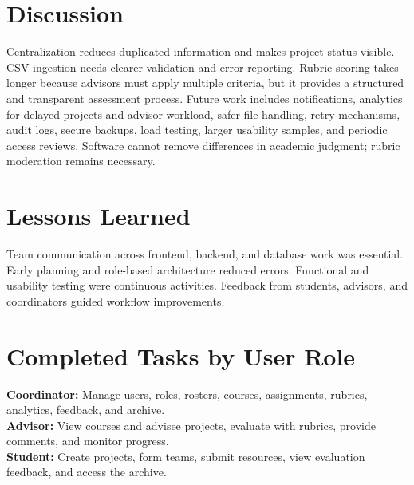 \documentclass[12pt,a4paper]{report}
\begin{document}
\section{Discussion}
Centralization reduces duplicated information and makes project status visible. CSV ingestion needs clearer validation and error reporting. Rubric scoring takes longer because advisors must apply multiple criteria, but it provides a structured and transparent assessment process. Future work includes notifications, analytics for delayed projects and advisor workload, safer file handling, retry mechanisms, audit logs, secure backups, load testing, larger usability samples, and periodic access reviews. Software cannot remove differences in academic judgment; rubric moderation remains necessary.
\section{Lessons Learned}
Team communication across frontend, backend, and database work was essential. Early planning and role-based architecture reduced errors. Functional and usability testing were continuous activities. Feedback from students, advisors, and coordinators guided workflow improvements.
\section{Completed Tasks by User Role}
\textbf{Coordinator:} Manage users, roles, rosters, courses, assignments, rubrics, analytics, feedback, and archive.\\
\textbf{Advisor:} View courses and advisee projects, evaluate with rubrics, provide comments, and monitor progress.\\
\textbf{Student:} Create projects, form teams, submit resources, view evaluation feedback, and access the archive.
\end{document}
